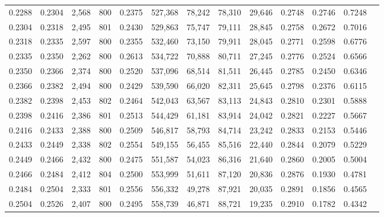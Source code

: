 \begin{tabular}{rrrrrrrrrrrrr}
0.2288 & 0.2304 &  2,568 & 800 &                                     0.2375 & 527,368 &  78,242 &  78,310 &  29,646 & 0.2748 & 0.2746 & 0.7248 \\
0.2304 & 0.2318 &  2,495 & 801 &                                     0.2430 & 529,863 &  75,747 &  79,111 &  28,845 & 0.2758 & 0.2672 & 0.7016 \\
0.2318 & 0.2335 &  2,597 & 800 &                                     0.2355 & 532,460 &  73,150 &  79,911 &  28,045 & 0.2771 & 0.2598 & 0.6776 \\
0.2335 & 0.2350 &  2,262 & 800 &                                     0.2613 & 534,722 &  70,888 &  80,711 &  27,245 & 0.2776 & 0.2524 & 0.6566 \\
0.2350 & 0.2366 &  2,374 & 800 &                                     0.2520 & 537,096 &  68,514 &  81,511 &  26,445 & 0.2785 & 0.2450 & 0.6346 \\
0.2366 & 0.2382 &  2,494 & 800 &                                     0.2429 & 539,590 &  66,020 &  82,311 &  25,645 & 0.2798 & 0.2376 & 0.6115 \\
0.2382 & 0.2398 &  2,453 & 802 &                                     0.2464 & 542,043 &  63,567 &  83,113 &  24,843 & 0.2810 & 0.2301 & 0.5888 \\
0.2398 & 0.2416 &  2,386 & 801 &                                     0.2513 & 544,429 &  61,181 &  83,914 &  24,042 & 0.2821 & 0.2227 & 0.5667 \\
0.2416 & 0.2433 &  2,388 & 800 &                                     0.2509 & 546,817 &  58,793 &  84,714 &  23,242 & 0.2833 & 0.2153 & 0.5446 \\
0.2433 & 0.2449 &  2,338 & 802 &                                     0.2554 & 549,155 &  56,455 &  85,516 &  22,440 & 0.2844 & 0.2079 & 0.5229 \\
0.2449 & 0.2466 &  2,432 & 800 &                                     0.2475 & 551,587 &  54,023 &  86,316 &  21,640 & 0.2860 & 0.2005 & 0.5004 \\
0.2466 & 0.2484 &  2,412 & 804 &                                     0.2500 & 553,999 &  51,611 &  87,120 &  20,836 & 0.2876 & 0.1930 & 0.4781 \\
0.2484 & 0.2504 &  2,333 & 801 &                                     0.2556 & 556,332 &  49,278 &  87,921 &  20,035 & 0.2891 & 0.1856 & 0.4565 \\
0.2504 & 0.2526 &  2,407 & 800 &                                     0.2495 & 558,739 &  46,871 &  88,721 &  19,235 & 0.2910 & 0.1782 & 0.4342 \\

\end{tabular}
